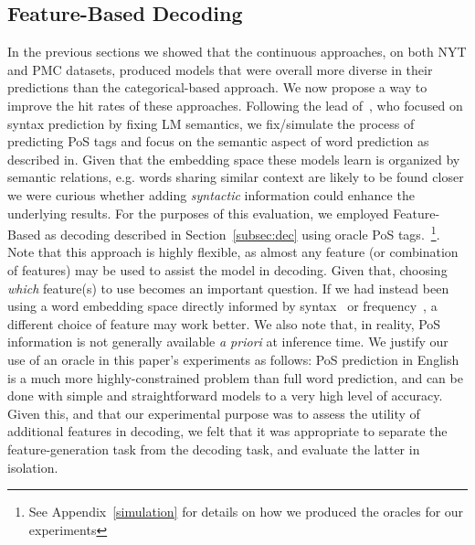 \documentclass[11pt,a4paper]{article}
\begin{document}
\subsection{Feature-Based Decoding}\label{decoding}

In the previous sections we showed that the continuous approaches, on both NYT and PMC datasets, produced models that were overall more diverse in their predictions than the categorical-based approach. 
We now propose a way to improve the hit rates of these approaches.  
Following the lead of~\cite{czarnowska2019don}, who focused on syntax prediction by fixing LM semantics, we fix/simulate the process of predicting PoS tags and focus on the semantic aspect of word prediction as described in.
Given that the embedding space these models learn is organized by semantic relations, e.g. words sharing similar context are likely to be found closer
we were curious whether adding \textit{syntactic} information could enhance the underlying results. 
For the purposes of this evaluation, we employed Feature-Based as decoding described in Section~\ref{subsec:dec} using  oracle PoS tags.~\footnote{See Appendix~\ref{simulation} for details on how we produced the oracles for our experiments}.
Note that this approach is highly flexible, as almost any feature (or combination of features) may be used to assist the model in decoding.
Given that, choosing \textit{which} feature(s) to use becomes an important question. If we had instead been using a word embedding space directly informed by syntax~\citep{levy2014dependency} or frequency~\citep{Gong2018aa}, a different choice of feature may work better. 
We also note that, in reality, PoS information is not generally available \textit{a priori} at inference time.
We justify our use of an oracle in this paper's experiments as follows: PoS prediction in English is a much more highly-constrained problem than full word prediction, and can be done with simple and straightforward models to a very high level of accuracy.
Given this, and that our experimental purpose was to assess the utility of additional features in decoding, we felt that it was appropriate to separate the feature-generation task from the decoding task, and evaluate the latter in isolation.
\end{document}

